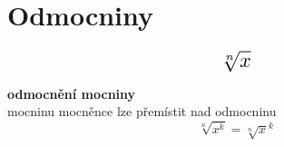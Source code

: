 \documentclass[a4paper,11pt]{article}
\begin{document}
\section{Odmocniny}
\begin{equation*}
    \scalebox{1.6}{$
        \sqrt[n]{x}
    $}
\end{equation*}

\begin{description}
    \item{\textbf{odmocnění mocniny}}\\
        mocninu mocněnce lze přemístit nad odmocninu
        \begin{equation*}
            \sqrt[n]{x^k} = \sqrt[n]{x}^k
        \end{equation*}
\end{description}
\end{document}
